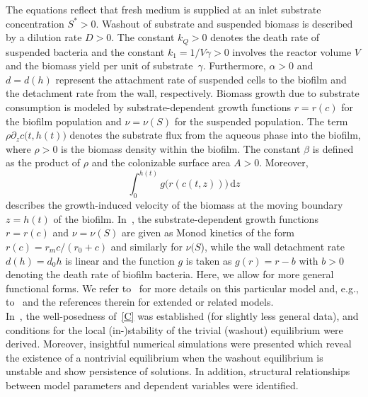 \documentclass[reqno,11pt]{amsart}
\numberwithin{equation}{section}
\newcommand{\rd}{\mathrm{d}}
\begin{document}
The equations reflect that fresh medium is supplied at an inlet substrate concentration $S^*>0$. 
Washout of substrate and suspended biomass is described by a dilution rate $D>0$. 
The constant $k_Q>0$ denotes the death rate of suspended bacteria and  the constant $k_1=1/V\gamma>0$ involves the reactor volume $V$ and the biomass yield per unit of substrate~$\gamma$. 
Furthermore, $\alpha>0$ and $d=d(h)$ represent the attachment rate of suspended cells to the biofilm and the detachment rate from the wall, respectively.
Biomass growth due to substrate consumption is modeled by substrate-dependent growth functions 
$r=r(c)$ for the biofilm population and $\nu=\nu(S)$ for the suspended population. 
The term 
$\rho \partial_z c\big(t,h(t)\big)$ denotes the substrate flux from the aqueous phase into the biofilm, where $\rho>0$ is the biomass density within the biofilm. 
The constant $\beta$ is defined as the product of $\rho$ and the colonizable surface area $A>0$.
Moreover,
\[
\int_0^{h(t)} g\big(r(c(t,z))\big)\,\rd z
\]
describes the growth-induced velocity of the biomass at the moving boundary $z=h(t)$ of the biofilm.  
In~\cite{MasicEberl12}, the substrate-dependent growth functions $r=r(c)$ and $\nu=\nu(S)$ are given as Monod kinetics of the form $r(c)=r_m c/(r_0+c)$ and similarly for $\nu(S$), while the wall detachment rate $d(h)=d_0h$ is linear and the function $g$ is taken as $g(r)=r-b$
with $b>0$ denoting the death rate of biofilm bacteria. Here, we allow for more general functional forms. We refer to~\cite{MasicEberl12,MasicEberl_16} for more details on this particular model and, e.g., to~\cite{BallykJonesSmith,Gaebler21,GaeblerHughesEberl_BMB_21,Jones03,ME14,ME14b,KD10,Stemmons} and the references therein for extended or related models.\\


In~\cite{MasicEberl12}, the well-posedness of~\eqref{C} was established (for slightly less general data), and conditions for the local (in-)stability of the trivial (washout) equilibrium were derived. Moreover, insightful numerical simulations were presented which reveal the existence of a nontrivial equilibrium when the washout equilibrium is unstable and show  persistence of solutions. In addition, structural relationships between model parameters and dependent variables were identified.
\end{document}

